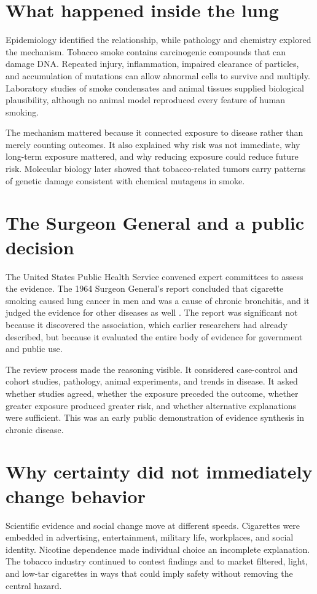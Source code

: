 \documentclass[12pt,oneside]{book}
\begin{document}
\section{What happened inside the lung}
Epidemiology identified the relationship, while pathology and chemistry explored
the mechanism. Tobacco smoke contains carcinogenic compounds that can damage
DNA. Repeated injury, inflammation, impaired clearance of particles, and
accumulation of mutations can allow abnormal cells to survive and multiply.
Laboratory studies of smoke condensates and animal tissues supplied biological
plausibility, although no animal model reproduced every feature of human
smoking.

The mechanism mattered because it connected exposure to disease rather than
merely counting outcomes. It also explained why risk was not immediate, why
long-term exposure mattered, and why reducing exposure could reduce future
risk. Molecular biology later showed that tobacco-related tumors carry patterns
of genetic damage consistent with chemical mutagens in smoke.

\section{The Surgeon General and a public decision}
The United States Public Health Service convened expert committees to assess the
evidence. The 1964 Surgeon General's report concluded that cigarette smoking
caused lung cancer in men and was a cause of chronic bronchitis, and it judged
the evidence for other diseases as well \cite{surgeongeneral1964}. The report was significant not because
it discovered the association, which earlier researchers had already described,
but because it evaluated the entire body of evidence for government and public
use.

The review process made the reasoning visible. It considered case-control and
cohort studies, pathology, animal experiments, and trends in disease. It asked
whether studies agreed, whether the exposure preceded the outcome, whether
greater exposure produced greater risk, and whether alternative explanations
were sufficient. This was an early public demonstration of evidence synthesis
in chronic disease.

\section{Why certainty did not immediately change behavior}
Scientific evidence and social change move at different speeds. Cigarettes were
embedded in advertising, entertainment, military life, workplaces, and social
identity. Nicotine dependence made individual choice an incomplete explanation.
The tobacco industry continued to contest findings and to market filtered,
light, and low-tar cigarettes in ways that could imply safety without removing
the central hazard.
\end{document}
